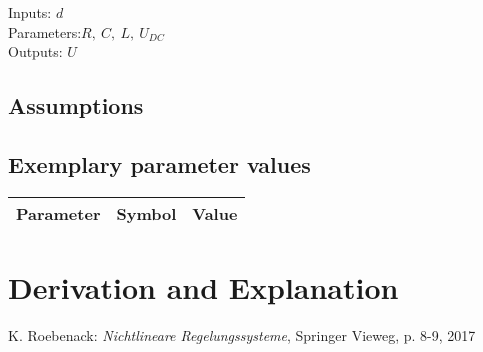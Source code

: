 \documentclass[10pt,a4paper]{article}
\begin{document}
	\noindent
	Inputs: $d$ 
	\\
	Parameters:$ R, ~C, ~L, ~U_{DC}$ %
	\\
	Outputs: $U$ %
	
	
	\subsection{Assumptions} %

	
	
	\subsection{Exemplary parameter values}
	\begin{tabular}{lcl} 
		Parameter & Symbol & Value \\ \hline	
	\end{tabular}

	
	\section{Derivation and Explanation} %
	
	
	\begin{thebibliography}{10}		
		K. Roebenack: 
		\textit{Nichtlineare Regelungssysteme}, Springer Vieweg, p. 8-9, 2017
	\end{thebibliography}
\end{document}

